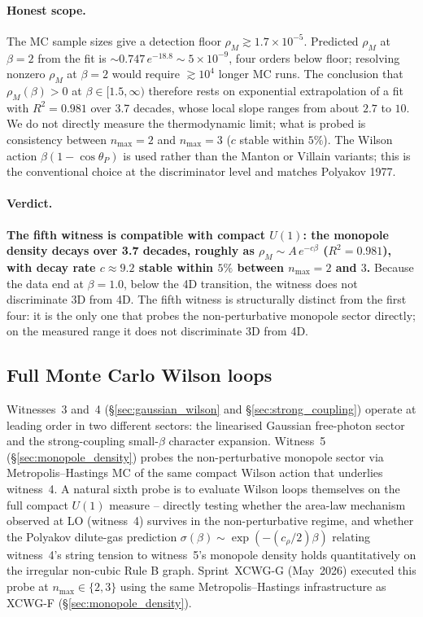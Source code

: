 \documentclass[11pt]{article}
\begin{document}
\paragraph{Honest scope.} The MC sample sizes give a detection floor
$\rho_M\gtrsim 1.7\times 10^{-5}$. Predicted $\rho_M$ at $\beta=2$ from the
fit is $\sim 0.747\,e^{-18.8}\sim 5\times 10^{-9}$, four orders below floor;
resolving nonzero $\rho_M$ at $\beta=2$ would require $\gtrsim 10^4$ longer
MC runs. The conclusion that $\rho_M(\beta)>0$ at $\beta\in[1.5,\infty)$
therefore rests on exponential extrapolation of a fit with $R^2=0.981$
over 3.7 decades, whose local slope ranges from about $2.7$ to $10$. We do not directly measure the thermodynamic limit; what
is probed is consistency between $n_\text{max}=2$ and $n_\text{max}=3$
($c$ stable within $5\%$). The Wilson action $\beta(1-\cos\theta_P)$ is used
rather than the Manton or Villain variants; this is the conventional choice
at the discriminator level and matches Polyakov 1977.

\paragraph{Verdict.} \textbf{The fifth witness is compatible with compact
$U(1)$: the monopole density decays over 3.7 decades, roughly as
$\rho_M\sim A\,e^{-c\beta}$ ($R^2=0.981$), with decay rate $c\approx 9.2$
stable within $5\%$ between $n_\text{max} = 2$ and $3$.}  Because the data
end at $\beta = 1.0$, below the 4D transition, the witness does not
discriminate 3D from 4D. The fifth witness is structurally
distinct from the first four: it is the only one that probes the
non-perturbative monopole sector directly; on the measured range it does
not discriminate 3D from 4D.

\subsection{Full Monte Carlo Wilson loops}
\label{sec:full_mc_wilson}

Witnesses~3 and~4 (\S\ref{sec:gaussian_wilson} and \S\ref{sec:strong_coupling})
operate at leading order in two different sectors: the linearised Gaussian
free-photon sector and the strong-coupling small-$\beta$ character expansion.
Witness~5 (\S\ref{sec:monopole_density}) probes the non-perturbative monopole
sector via Metropolis--Hastings MC of the same compact Wilson action that
underlies witness~4. A natural sixth probe is to evaluate Wilson loops
themselves on the full compact $U(1)$ measure -- directly testing whether
the area-law mechanism observed at LO (witness~4) survives in the
non-perturbative regime, and whether the Polyakov dilute-gas prediction
$\sigma(\beta)\sim\exp(-(c_\rho/2)\beta)$ relating witness~4's string tension
to witness~5's monopole density holds quantitatively on the irregular
non-cubic Rule B graph. Sprint~XCWG-G (May~2026) executed this probe at
$n_\text{max}\in\{2,3\}$ using the same Metropolis--Hastings infrastructure
as XCWG-F (\S\ref{sec:monopole_density}).
\end{document}
